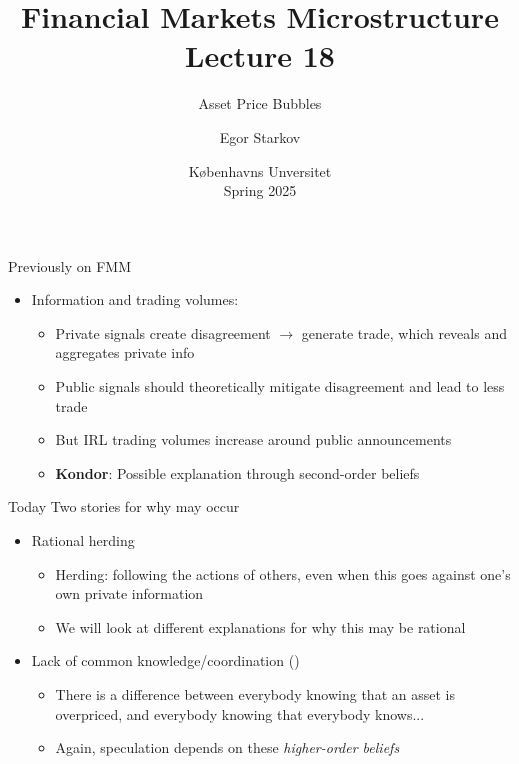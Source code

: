 \documentclass[english,10pt
,aspectratio=169
]{beamer}
\title{Financial Markets Microstructure \\ Lecture 18}
\subtitle{Asset Price Bubbles}
\author{Egor Starkov}
\date{K{\o}benhavns Unversitet \\
	Spring 2025}
\begin{document}
	\frame[plain]{\titlepage}



\begin{frame}{Previously on FMM}
	\begin{itemize}
		\item Information and trading volumes:
		\begin{itemize}
			\item Private signals create disagreement $\to$ generate trade, which reveals and aggregates private info
			\item Public signals should theoretically mitigate disagreement and lead to less trade
			\item But IRL trading volumes increase around public announcements
			\item \textbf{Kondor}: Possible explanation through second-order beliefs
		\end{itemize}
	\end{itemize}
\end{frame}	


\begin{frame}{Today}
	Two stories for why  may occur
	\begin{itemize}
		\item Rational herding
		\begin{itemize}
			\item Herding: following the actions of others, even when this goes against one's own private information
			\item We will look at different explanations for why this may be rational
		\end{itemize}
		\item Lack of common knowledge/coordination (\cite{abreu_bubbles_2003})
		\begin{itemize}
			\item There is a difference between everybody knowing that an asset is overpriced, and everybody knowing that everybody knows...
			\item Again, speculation depends on these \emph{higher-order beliefs}
		\end{itemize}
	\end{itemize}
\end{frame}
\end{document}
